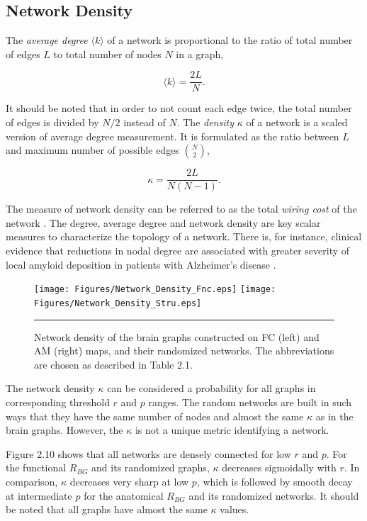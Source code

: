 \subsection{Network Density}
The \textit{average degree} $\langle k \rangle$ of a network is proportional to the ratio of total number of edges $L$ to total number of nodes $N$ in a graph, 

\begin{equation}
\langle k \rangle = \frac{2L}{N}.
\end{equation}

It should be noted that in order to not count each edge twice, the total number of edges is divided by $N/2$ instead of $N$. The \textit{density} $\kappa$ of a network is a scaled version of average degree measurement. It is formulated as the ratio between $L$ and maximum number of possible edges $\binom{N}{2}$,

\begin{equation}
\kappa = \frac{2L}{N(N-1)}.
\end{equation}	

The measure of network density can be referred to as the total \textit{wiring cost} of the network \citep{RUB10}. The degree, average degree and network density are key scalar measures to characterize the topology of a network. There is, for instance, clinical evidence that reductions in nodal degree are associated with greater severity of local amyloid deposition in patients with Alzheimer's disease \citep{XYZ2009}. 

\begin{figure}[htbp]
  \centering
	\texttt{[image: Figures/Network\_Density\_Fnc.eps]}
	\texttt{[image: Figures/Network\_Density\_Stru.eps]}  
    \rule{35em}{0.5pt}
    \caption[Network Density]{Network density of the brain graphs constructed on FC (left) and AM (right) maps, and their randomized networks. The abbreviations are chosen as described in Table 2.1.}
  \label{fig:Network Density}
\end{figure}


The network density $\kappa$ can be considered a probability for all graphs in corresponding threshold $r$ and $p$ ranges. The random networks are built in such ways that they have the same number of nodes and almost the same $\kappa$ as in the brain graphs. However, the $\kappa$ is not a unique metric identifying a network.

Figure 2.10 shows that all networks are densely connected for low $r$ and $p$. For the functional $R_{BG}$ and its randomized graphs, $\kappa$ decreases sigmoidally with $r$. In comparison, $\kappa$ decreases very sharp at low $p$, which is followed by smooth decay at intermediate $p$ for the anatomical  $R_{BG}$ and its randomized networks. It should be noted that all graphs have almost the same $\kappa$ values. 


